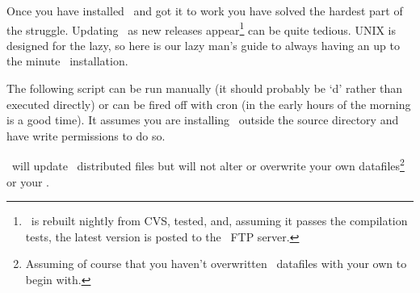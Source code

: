 \documentclass{report}
\begin{document}
Once you have installed \EMBOSS\ and got it to work you have solved
the hardest part of the struggle. Updating \EMBOSS\ as new releases
appear\footnote{\EMBOSS\ is rebuilt nightly from CVS, tested, and,
assuming it passes the compilation tests, the latest version is posted
to the \EMBOSS\ FTP server. } can be quite tedious. UNIX is designed
for the lazy, so here is our lazy man's guide to always having an up to
the minute \EMBOSS\ installation.

The following script can be run manually (it should probably be
`d' rather than executed directly) or can be fired off
with cron (in the early hours of the morning is a good time). It
assumes you are installing \EMBOSS\ outside the source directory and
have write permissions to do so.

\EMBOSS\ will update \EMBOSS\ distributed files but will not alter or
overwrite your own datafiles\footnote{Assuming of course that you
haven't overwritten \EMBOSS\ datafiles with your own to begin with.}
or your .
\end{document}
